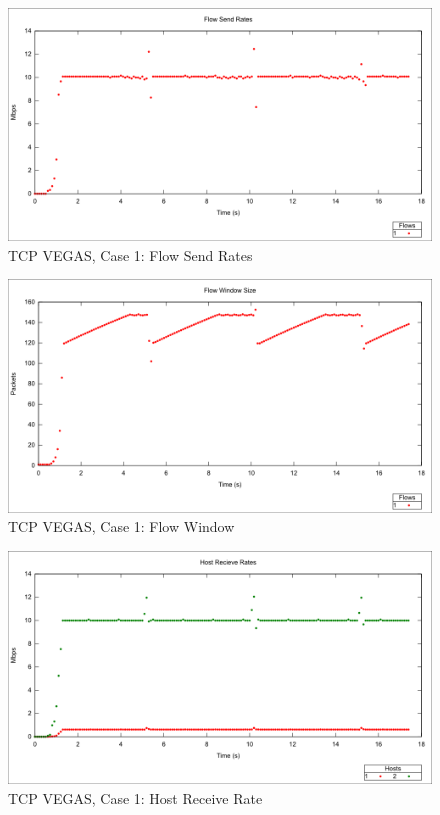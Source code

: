 \begin{figure}[htbp]
    \centering
    \includegraphics[width=\textwidth]{vegas1/Flow_Send_Rates.png}
    \caption{TCP VEGAS, Case 1: Flow Send Rates}
\end{figure}

\begin{figure}[htbp]
    \centering
    \includegraphics[width=\textwidth]{vegas1/Flow_Window.png}
    \caption{TCP VEGAS, Case 1: Flow Window}
\end{figure}

\begin{figure}[htbp]
    \centering
    \includegraphics[width=\textwidth]{vegas1/Host_Receive.png}
    \caption{TCP VEGAS, Case 1: Host Receive Rate}
\end{figure}


